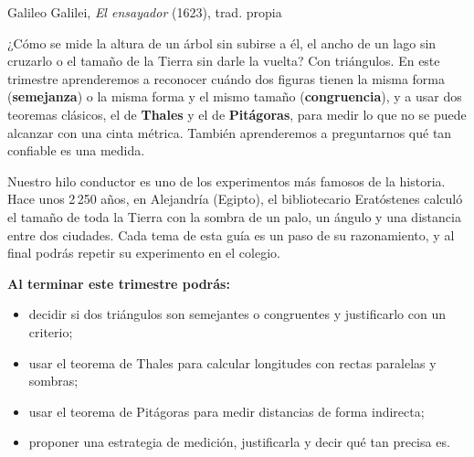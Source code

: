 \documentclass[11pt]{article}
\begin{document}
\encabezado

{Galileo Galilei, \emph{El ensayador} (1623), trad. propia~\cite{galileo1623}}


¿Cómo se mide la altura de un árbol sin subirse a él, el ancho de un lago sin
cruzarlo o el tamaño de la Tierra sin darle la vuelta? Con triángulos. En este
trimestre aprenderemos a reconocer cuándo dos figuras tienen la misma forma
(\textbf{semejanza}) o la misma forma y el mismo tamaño (\textbf{congruencia}), y a
usar dos teoremas clásicos, el de \textbf{Thales} y el de \textbf{Pitágoras}, para
medir lo que no se puede alcanzar con una cinta métrica. También aprenderemos a
preguntarnos qué tan confiable es una medida.

Nuestro hilo conductor es uno de los experimentos más famosos de la historia. Hace
unos 2\,250 años, en Alejandría (Egipto), el bibliotecario Eratóstenes calculó el
tamaño de toda la Tierra con la sombra de un palo, un ángulo y una distancia entre
dos ciudades. Cada tema de esta guía es un paso de su razonamiento, y al final
podrás repetir su experimento en el colegio.

\textbf{Al terminar este trimestre podrás:}
\begin{itemize}
  \item decidir si dos triángulos son semejantes o congruentes y justificarlo con un criterio;
  \item usar el teorema de Thales para calcular longitudes con rectas paralelas y sombras;
  \item usar el teorema de Pitágoras para medir distancias de forma indirecta;
  \item proponer una estrategia de medición, justificarla y decir qué tan precisa es.
\end{itemize}
\end{document}
